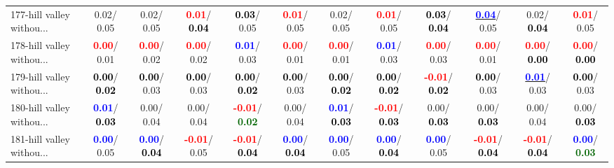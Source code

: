 \begin{table}[h]
\begin{center}
{\begin{tabular}{lc|c|c|c|c|c|c|c|c|c|c}
177-hill valley withou... &   0.02/  0.05 &   0.02/  0.05 & \textcolor{red}{\textbf{  0.01}}/\textcolor{black}{\textbf{  0.04}} & \textcolor{black}{\textbf{  0.03}}/  0.05 & \textcolor{red}{\textbf{  0.01}}/  0.05 &   0.02/  0.05 & \textcolor{red}{\textbf{  0.01}}/  0.05 & \textcolor{black}{\textbf{  0.03}}/\textcolor{black}{\textbf{  0.04}} & \underline{\textcolor{blue}{\textbf{  0.04}}}/  0.05 &   0.02/\textcolor{black}{\textbf{  0.04}} & \textcolor{red}{\textbf{  0.01}}/  0.05 \\
178-hill valley withou... & \textcolor{red}{\textbf{  0.00}}/  0.01 & \textcolor{red}{\textbf{  0.00}}/  0.02 & \textcolor{red}{\textbf{  0.00}}/  0.02 & \textcolor{blue}{\textbf{  0.01}}/  0.03 & \textcolor{red}{\textbf{  0.00}}/  0.01 & \textcolor{red}{\textbf{  0.00}}/  0.01 & \textcolor{blue}{\textbf{  0.01}}/  0.03 & \textcolor{red}{\textbf{  0.00}}/  0.03 & \textcolor{red}{\textbf{  0.00}}/  0.01 & \textcolor{red}{\textbf{  0.00}}/\textcolor{black}{\textbf{  0.00}} & \textcolor{red}{\textbf{  0.00}}/\textcolor{black}{\textbf{  0.00}} \\
179-hill valley withou... & \textcolor{black}{\textbf{  0.00}}/\textcolor{black}{\textbf{  0.02}} & \textcolor{black}{\textbf{  0.00}}/  0.03 & \textcolor{black}{\textbf{  0.00}}/  0.03 & \textcolor{black}{\textbf{  0.00}}/\textcolor{black}{\textbf{  0.02}} & \textcolor{black}{\textbf{  0.00}}/  0.03 & \textcolor{black}{\textbf{  0.00}}/\textcolor{black}{\textbf{  0.02}} & \textcolor{black}{\textbf{  0.00}}/\textcolor{black}{\textbf{  0.02}} & \textcolor{red}{\textbf{ -0.01}}/\textcolor{black}{\textbf{  0.02}} & \textcolor{black}{\textbf{  0.00}}/  0.03 & \underline{\textcolor{blue}{\textbf{  0.01}}}/  0.03 & \textcolor{black}{\textbf{  0.00}}/  0.03 \\
180-hill valley withou... & \textcolor{blue}{\textbf{  0.01}}/\textcolor{black}{\textbf{  0.03}} &   0.00/  0.04 &   0.00/  0.04 & \textcolor{red}{\textbf{ -0.01}}/\textcolor{darkgreen}{\textbf{  0.02}} &   0.00/  0.04 & \textcolor{blue}{\textbf{  0.01}}/\textcolor{black}{\textbf{  0.03}} & \textcolor{red}{\textbf{ -0.01}}/\textcolor{black}{\textbf{  0.03}} &   0.00/\textcolor{black}{\textbf{  0.03}} &   0.00/\textcolor{black}{\textbf{  0.03}} &   0.00/  0.04 &   0.00/\textcolor{black}{\textbf{  0.03}} \\
181-hill valley withou... & \textcolor{blue}{\textbf{  0.00}}/  0.05 & \textcolor{blue}{\textbf{  0.00}}/\textcolor{black}{\textbf{  0.04}} & \textcolor{red}{\textbf{ -0.01}}/  0.05 & \textcolor{red}{\textbf{ -0.01}}/\textcolor{black}{\textbf{  0.04}} & \textcolor{blue}{\textbf{  0.00}}/\textcolor{black}{\textbf{  0.04}} & \textcolor{blue}{\textbf{  0.00}}/  0.05 & \textcolor{blue}{\textbf{  0.00}}/\textcolor{black}{\textbf{  0.04}} & \textcolor{blue}{\textbf{  0.00}}/  0.05 & \textcolor{red}{\textbf{ -0.01}}/\textcolor{black}{\textbf{  0.04}} & \textcolor{red}{\textbf{ -0.01}}/\textcolor{black}{\textbf{  0.04}} & \textcolor{blue}{\textbf{  0.00}}/\textcolor{darkgreen}{\textbf{  0.03}} \\ \hline

\end{tabular}}
\end{center}
\end{table}
